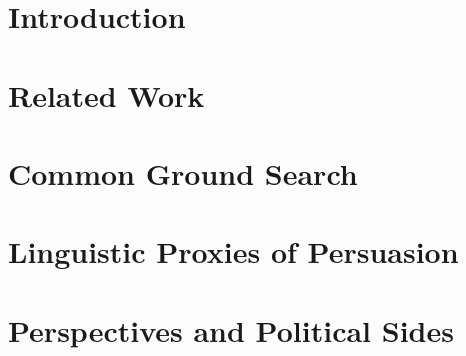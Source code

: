 \documentclass[12pt,lot, lof]{outhesis}
\newcommand{\statusorange}{}%
\DeclareRobustCommand{\statusorange}{%
      \textcolor{orange}{\HandPencilLeft}
    }
\newcommand{\statusred}{}%
\DeclareRobustCommand{\statusred}{%
      \textcolor{red}{\XSolidBold}
    }
\newcommand{\statusorange}{}%
\DeclareRobustCommand{\statusorange}{}
\newcommand{\statusred}{}%
\DeclareRobustCommand{\statusred}{}
\begin{document}
\listoftodos


\makefrontmatter







\chapter{\statusred Introduction}


\chapter{\statusred Related Work}


\chapter{\statusorange Common Ground Search}


\chapter{\statusred Linguistic Proxies of Persuasion}


\chapter{\statusred Perspectives and Political Sides}

\end{document}
